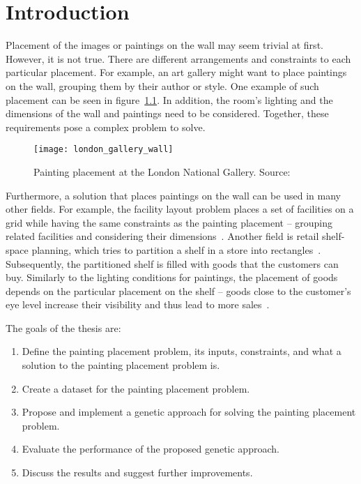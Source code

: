 \chapter{Introduction}\label{ch:introduction}

Placement of the images or paintings on the wall may seem trivial at first.
However, it is not true.
There are different arrangements and constraints to each particular placement.
For example, an art gallery might want to place paintings on the wall, grouping them by their author or style.
One example of such placement can be seen in figure~\ref{fig:london-wall}.
In addition, the room's lighting and the dimensions of the wall and paintings need to be considered.
Together, these requirements pose a complex problem to solve.

\begin{figure}[]
    \texttt{[image: london\_gallery\_wall]}
    \caption[Painting placement at the London National Gallery]{Painting placement at the London National Gallery. Source:~\cite{ScreenshotWallGoogle}}
    \label{fig:london-wall}
\end{figure}


Furthermore, a solution that places paintings on the wall can be used in many other fields.
For example, the facility layout problem places a set of facilities on a grid
while having the same constraints as the painting placement – grouping related facilities and considering their dimensions~\cite{goncalvesBiasedRandomkeyGenetic2015}.
Another field is retail shelf-space planning, which tries to partition a shelf in a store into rectangles~\cite{yangStudyShelfSpace1999}.
Subsequently, the partitioned shelf is filled with goods that the customers can buy.
Similarly to the lighting conditions for paintings, the placement of goods depends on the
particular placement on the shelf – goods close to the customer's eye level increase their visibility and thus lead to more sales~\cite{hwangGeneticAlgorithmApproach2009}.

The goals of the thesis are:

\begin{enumerate}
    \item Define the painting placement problem, its inputs, constraints, and what a solution to the painting placement problem is.
    \item Create a dataset for the painting placement problem.
    \item Propose and implement a genetic approach for solving the painting placement problem.
    \item Evaluate the performance of the proposed genetic approach.
    \item Discuss the results and suggest further improvements.
\end{enumerate}

